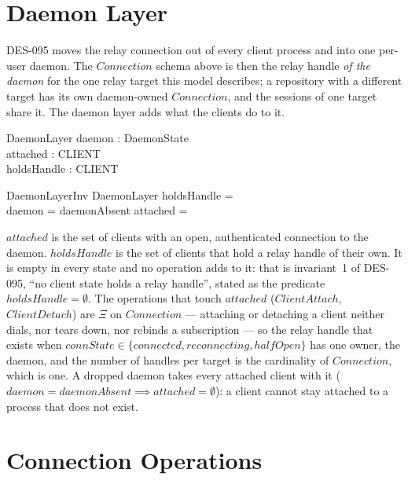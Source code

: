 \documentclass[a4paper,10pt,fleqn]{article}
\begin{document}
\section{Daemon Layer}
\label{sec:daemon}

DES-095 moves the relay connection out of every client process and into
one per-user daemon.  The $Connection$ schema above is then the relay
handle \emph{of the daemon} for the one relay target this model
describes; a repository with a different target has its own daemon-owned
$Connection$, and the sessions of one target share it.  The daemon layer
adds what the clients do to it.

\begin{schema}{DaemonLayer}
  daemon : DaemonState \\
  attached : \power CLIENT \\
  holdsHandle : \power CLIENT
\end{schema}

\begin{schema}{DaemonLayerInv}
  DaemonLayer
  \where
  holdsHandle = \emptyset \\
  daemon = daemonAbsent \implies attached = \emptyset
\end{schema}

$attached$ is the set of clients with an open, authenticated connection
to the daemon.  $holdsHandle$ is the set of clients that hold a relay
handle of their own.  It is empty in every state and no operation adds
to it: that is invariant~1 of DES-095, ``no client state holds a relay
handle'', stated as the predicate $holdsHandle = \emptyset$.  The
operations that touch $attached$ ($ClientAttach$, $ClientDetach$) are
$\Xi$ on $Connection$ --- attaching or detaching a client neither dials,
nor tears down, nor rebinds a subscription --- so the relay handle that
exists when $connState \in \{ connected, reconnecting, halfOpen \}$ has
one owner, the daemon, and the number of handles per target is the
cardinality of $Connection$, which is one.  A dropped daemon takes every
attached client with it ($daemon = daemonAbsent \implies attached =
\emptyset$): a client cannot stay attached to a process that does not
exist.

\section{Connection Operations}
\end{document}
